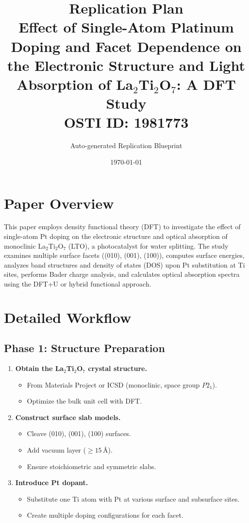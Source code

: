 \documentclass[11pt,a4paper]{article}
\title{\textbf{Replication Plan}\\[0.5em]
\large Effect of Single-Atom Platinum Doping and Facet Dependence on the Electronic Structure and Light Absorption of La$_2$Ti$_2$O$_7$: A DFT Study\\[0.3em]
\normalsize OSTI ID: 1981773}
\author{Auto-generated Replication Blueprint}
\date{\today}
\begin{document}
\maketitle
\tableofcontents
\newpage

\section{Paper Overview}
This paper employs density functional theory (DFT) to investigate the effect of single-atom Pt doping on the electronic structure and optical absorption of monoclinic La$_2$Ti$_2$O$_7$ (LTO), a photocatalyst for water splitting. The study examines multiple surface facets ((010), (001), (100)), computes surface energies, analyzes band structures and density of states (DOS) upon Pt substitution at Ti sites, performs Bader charge analysis, and calculates optical absorption spectra using the DFT+U or hybrid functional approach.

\section{Detailed Workflow}

\subsection{Phase 1: Structure Preparation}
\begin{enumerate}[label=\textbf{1.\arabic*}]
  \item \textbf{Obtain the La$_2$Ti$_2$O$_7$ crystal structure.}
    \begin{itemize}
      \item From Materials Project or ICSD (monoclinic, space group $P2_1$).
      \item Optimize the bulk unit cell with DFT.
    \end{itemize}
  \item \textbf{Construct surface slab models.}
    \begin{itemize}
      \item Cleave (010), (001), (100) surfaces.
      \item Add vacuum layer ($\geq 15$\,\AA).
      \item Ensure stoichiometric and symmetric slabs.
    \end{itemize}
  \item \textbf{Introduce Pt dopant.}
    \begin{itemize}
      \item Substitute one Ti atom with Pt at various surface and subsurface sites.
      \item Create multiple doping configurations for each facet.
    \end{itemize}
\end{enumerate}
\end{document}
